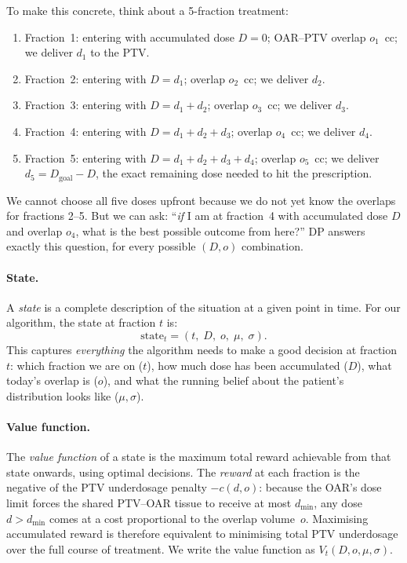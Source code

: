 \documentclass[11pt]{article}
\newcommand{\Dgoal}{D_{\mathrm{goal}}}
\newcommand{\dmin}{d_{\min}}
\theoremstyle{definition}
\begin{document}
To make this concrete, think about a 5-fraction treatment:
\begin{enumerate}
  \item Fraction~1: entering with accumulated dose $D = 0$;
        OAR--PTV overlap $o_1$~cc; we deliver $d_1$ to the PTV.
  \item Fraction~2: entering with $D = d_1$;
        overlap $o_2$~cc; we deliver $d_2$.
  \item Fraction~3: entering with $D = d_1 + d_2$;
        overlap $o_3$~cc; we deliver $d_3$.
  \item Fraction~4: entering with $D = d_1 + d_2 + d_3$;
        overlap $o_4$~cc; we deliver $d_4$.
  \item Fraction~5: entering with $D = d_1 + d_2 + d_3 + d_4$;
        overlap $o_5$~cc; we deliver $d_5 = \Dgoal - D$,
        the exact remaining dose needed to hit the prescription.
\end{enumerate}
We cannot choose all five doses upfront because we do not yet know the
overlaps for fractions 2--5.  But we can ask: ``\emph{if} I am at fraction~4
with accumulated dose $D$ and overlap $o_4$, what is the best
possible outcome from here?''  DP answers exactly this question, for every
possible $(D, o)$ combination.

\paragraph{State.}
A \emph{state} is a complete description of the situation at a given point in
time.  For our algorithm, the state at fraction $t$ is:
\[
  \text{state}_t = (t,\; D,\; o,\; \mu,\; \sigma).
\]
This captures \emph{everything} the algorithm needs to make a good decision
at fraction $t$: which fraction we are on ($t$), how much dose has been
accumulated ($D$), what today's overlap is ($o$), and what the running
belief about the patient's distribution looks like ($\mu, \sigma$).

\paragraph{Value function.}
The \emph{value function} of a state is the maximum total reward achievable
from that state onwards, using optimal decisions.  The \emph{reward} at
each fraction is the negative of the PTV underdosage penalty $-c(d, o)$:
because the OAR's dose limit forces the shared PTV--OAR tissue to receive
at most $\dmin$, any dose $d > \dmin$ comes at a cost proportional to the
overlap volume~$o$.  Maximising accumulated reward is therefore equivalent
to minimising total PTV underdosage over the full course of treatment.  We write the value function as
$V_t(D, o, \mu, \sigma)$.
\end{document}
